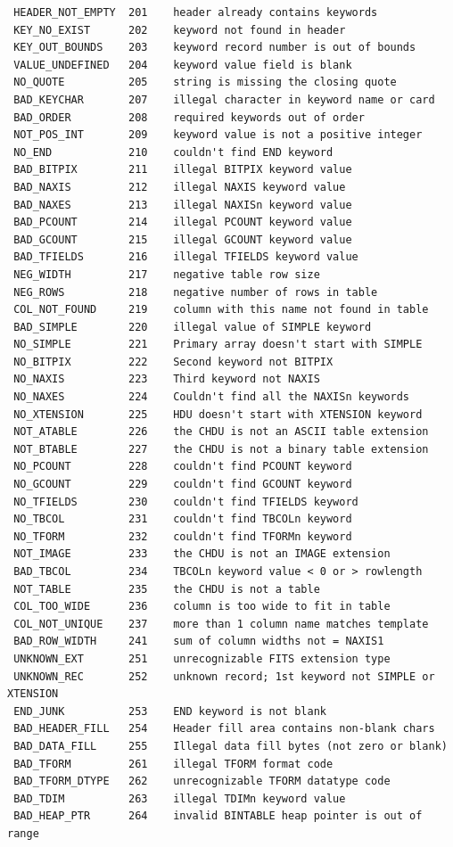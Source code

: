 \documentclass[11pt]{article}
\begin{document}
\begin{verbatim}
 HEADER_NOT_EMPTY  201    header already contains keywords
 KEY_NO_EXIST      202    keyword not found in header
 KEY_OUT_BOUNDS    203    keyword record number is out of bounds
 VALUE_UNDEFINED   204    keyword value field is blank
 NO_QUOTE          205    string is missing the closing quote
 BAD_KEYCHAR       207    illegal character in keyword name or card
 BAD_ORDER         208    required keywords out of order
 NOT_POS_INT       209    keyword value is not a positive integer
 NO_END            210    couldn't find END keyword
 BAD_BITPIX        211    illegal BITPIX keyword value
 BAD_NAXIS         212    illegal NAXIS keyword value
 BAD_NAXES         213    illegal NAXISn keyword value
 BAD_PCOUNT        214    illegal PCOUNT keyword value
 BAD_GCOUNT        215    illegal GCOUNT keyword value
 BAD_TFIELDS       216    illegal TFIELDS keyword value
 NEG_WIDTH         217    negative table row size
 NEG_ROWS          218    negative number of rows in table
 COL_NOT_FOUND     219    column with this name not found in table
 BAD_SIMPLE        220    illegal value of SIMPLE keyword
 NO_SIMPLE         221    Primary array doesn't start with SIMPLE
 NO_BITPIX         222    Second keyword not BITPIX
 NO_NAXIS          223    Third keyword not NAXIS
 NO_NAXES          224    Couldn't find all the NAXISn keywords
 NO_XTENSION       225    HDU doesn't start with XTENSION keyword
 NOT_ATABLE        226    the CHDU is not an ASCII table extension
 NOT_BTABLE        227    the CHDU is not a binary table extension
 NO_PCOUNT         228    couldn't find PCOUNT keyword
 NO_GCOUNT         229    couldn't find GCOUNT keyword
 NO_TFIELDS        230    couldn't find TFIELDS keyword
 NO_TBCOL          231    couldn't find TBCOLn keyword
 NO_TFORM          232    couldn't find TFORMn keyword
 NOT_IMAGE         233    the CHDU is not an IMAGE extension
 BAD_TBCOL         234    TBCOLn keyword value < 0 or > rowlength
 NOT_TABLE         235    the CHDU is not a table
 COL_TOO_WIDE      236    column is too wide to fit in table
 COL_NOT_UNIQUE    237    more than 1 column name matches template
 BAD_ROW_WIDTH     241    sum of column widths not = NAXIS1
 UNKNOWN_EXT       251    unrecognizable FITS extension type
 UNKNOWN_REC       252    unknown record; 1st keyword not SIMPLE or XTENSION
 END_JUNK          253    END keyword is not blank
 BAD_HEADER_FILL   254    Header fill area contains non-blank chars
 BAD_DATA_FILL     255    Illegal data fill bytes (not zero or blank)
 BAD_TFORM         261    illegal TFORM format code
 BAD_TFORM_DTYPE   262    unrecognizable TFORM datatype code
 BAD_TDIM          263    illegal TDIMn keyword value
 BAD_HEAP_PTR      264    invalid BINTABLE heap pointer is out of range


\end{verbatim}
\end{document}
